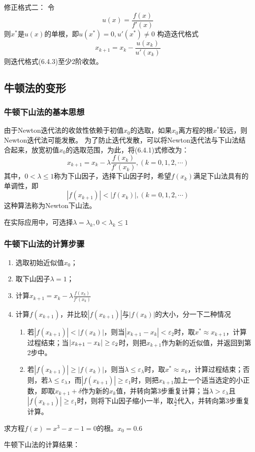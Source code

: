 修正格式二：
令
\[u(x) = \frac{f(x)}{f'(x)}\]
则$x^*$是$u(x)$的单根，即$u(x^*) = 0,u'(x^*) \neq 0$
构造迭代格式
\begin{equation}
    x_{k+1} = x_k-\frac{u(x_k)}{u'(x_k)}
\end{equation}
则迭代格式(6.4.3)至少2阶收敛。


\subsection{牛顿法的变形}

\subsubsection{牛顿下山法的基本思想}
由于Newton迭代法的收敛性依赖于初值$x_0$的选取，如果$x_0$离方程的根$x^*$较远，则Newton迭代法可能发散。
为了防止迭代发散，可以将Newton迭代法与下山法结合起来，放宽初值$x_0$的选取范围，为此，将(6.4.1)式修改为：
\begin{equation*}
    x_{k+1} = x_k-\lambda\frac{f(x_k)}{f'(x_k)},(k=0,1,2,\cdots)
\end{equation*}
其中，$0 < \lambda \leq 1$称为下山因子，选择下山因子时，希望$f(x_k)$满足下山法具有的单调性，即
\begin{equation*}
    |f(x_{k+1})| < |f(x_k)|,(k = 0,1,2,\cdots)
\end{equation*}
这种算法称为Newton下山法。

在实际应用中，可选择$\lambda = \lambda_k,0<\lambda_k \leq 1$

\subsubsection{牛顿下山法的计算步骤}
\begin{enumerate}
    \item 选取初始近似值$x_0$；
    \item 取下山因子$\lambda = 1$；
    \item 计算$x_{k+1} = x_k -\lambda\frac{f(x_k)}{f'(x_k)}$
    \item 计算$f(x_{k+1})$，并比较$|f(x_{k+1})|$与$|f(x_k)|$的大小，分一下二种情况
    
    \begin{enumerate}
        \item 若$|f(x_{k+1})| < |f(x_k)|$，则当$|x_{k+1}-x_k| < \varepsilon_2$时，取$x^* \approx x_{k+1}$，计算过程结束；当$\abs{x_{k+1}-x_k} \geq \varepsilon_2$时，则把$x_{k+1}$作为新的近似值，并返回到第2步中。
        \item 若$|f(x_{k+1})| \geq |f(x_k)|$，则当$\lambda \leq \varepsilon_\lambda$时，取$x^* \approx x_{k}$，计算过程结束；否则，若$\lambda \leq \varepsilon_\lambda$，而$|f(x_{k+1})| \geq \varepsilon_1$时，则把$x_{k+1}$加上一个适当选定的小正数，即取$x_{k+1}+\delta$作为新的$x_k$值，并转向第3步重复计算；当$\lambda > \varepsilon_\lambda$且$|f(x_{k+1})| \geq \varepsilon_1$时，则将下山因子缩小一半，取$\frac{\lambda}{2}$代入，并转向第3步重复计算。
    \end{enumerate}
\end{enumerate}

\begin{example}
    求方程$f(x) = x^3-x-1 = 0$的根。$x_0 = 0.6$
    \begin{solution}
        牛顿下山法的计算结果：%
    \end{solution}
\end{example}
